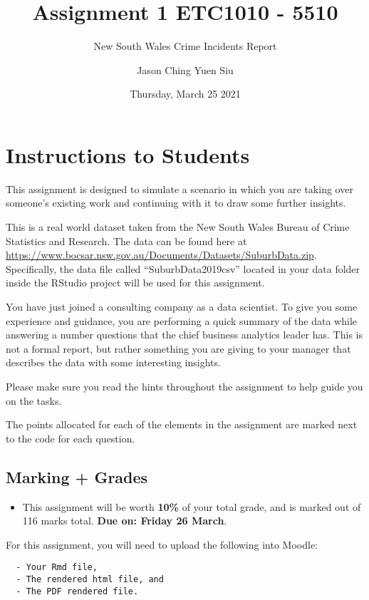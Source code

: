 \documentclass[
]{article}
\title{Assignment 1 ETC1010 - 5510}
\subtitle{New South Wales Crime Incidents Report}
\author{Jason Ching Yuen Siu}
\date{Thursday, March 25 2021}
\providecommand{\tightlist}{%
  \setlength{\itemsep}{0pt}\setlength{\parskip}{0pt}}
\begin{document}
\maketitle

\hypertarget{instructions-to-students}{%
\section{Instructions to Students}\label{instructions-to-students}}

This assignment is designed to simulate a scenario in which you are
taking over someone's existing work and continuing with it to draw some
further insights.

This is a real world dataset taken from the New South Wales Bureau of
Crime Statistics and Research. The data can be found here at
\url{https://www.bocsar.nsw.gov.au/Documents/Datasets/SuburbData.zip}.
Specifically, the data file called ``SuburbData2019csv'' located in your
data folder inside the RStudio project will be used for this assignment.

You have just joined a consulting company as a data scientist. To give
you some experience and guidance, you are performing a quick summary of
the data while answering a number questions that the chief business
analytics leader has. This is not a formal report, but rather something
you are giving to your manager that describes the data with some
interesting insights.

Please make sure you read the hints throughout the assignment to help
guide you on the tasks.

The points allocated for each of the elements in the assignment are
marked next to the code for each question.

\hypertarget{marking-grades}{%
\subsection{Marking + Grades}\label{marking-grades}}

\begin{itemize}
\tightlist
\item
  This assignment will be worth \textbf{10\%} of your total grade, and
  is marked out of 116 marks total. \textbf{Due on: Friday 26 March}.
\end{itemize}

For this assignment, you will need to upload the following into Moodle:

\begin{verbatim}
  - Your Rmd file,
  - The rendered html file, and
  - The PDF rendered file.
  
\end{verbatim}
\end{document}
